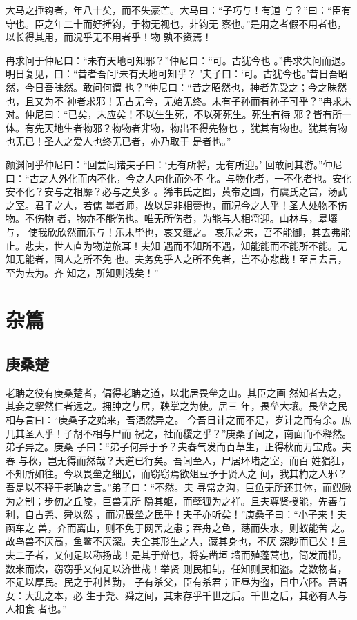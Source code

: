 \documentclass[12pt,UTF8]{ctexbook}
\begin{document}
大马之捶钩者，年八十矣，而不失豪芒。大马曰：“子巧与！有道 与？”曰：“臣有守也。臣之年二十而好捶钩，于物无视也，非钩无 察也。”是用之者假不用者也，以长得其用，而况乎无不用者乎！物 孰不资焉！

冉求问于仲尼曰：“未有天地可知邪？”仲尼曰：“可。古犹今也 。”冉求失问而退。明日复见，曰：“昔者吾问‘未有天地可知乎？ ’夫子曰：‘可。古犹今也。’昔日吾昭然，今日吾昧然。敢问何谓 也？”仲尼曰：“昔之昭然也，神者先受之；今之昧然也，且又为不 神者求邪！无古无今，无始无终。未有子孙而有孙子可乎？”冉求未 对。仲尼曰：“已矣，末应矣！不以生生死，不以死死生。死生有待 邪？皆有所一体。有先天地生者物邪？物物者非物，物出不得先物也 ，犹其有物也。犹其有物也无已！圣人之爱人也终无已者，亦乃取于 是者也。”

颜渊问乎仲尼曰：“回尝闻诸夫子曰：‘无有所将，无有所迎。’ 回敢问其游。”仲尼曰：“古之人外化而内不化，今之人内化而外不 化。与物化者，一不化者也。安化安不化？安与之相靡？必与之莫多 。狶韦氏之囿，黄帝之圃，有虞氏之宫，汤武之室。君子之人，若儒 墨者师，故以是非相赍也，而况今之人乎！圣人处物不伤物。不伤物 者，物亦不能伤也。唯无所伤者，为能与人相将迎。山林与，皋壤与， 使我欣欣然而乐与！乐未毕也，哀又继之。 哀乐之来，吾不能御，其去弗能止。悲夫，世人直为物逆旅耳！夫知 遇而不知所不遇，知能能而不能所不能。无知无能者，固人之所不免 也。夫务免乎人之所不免者，岂不亦悲哉！至言去言，至为去为。齐 知之，所知则浅矣！”


\chapter{杂篇}

\section{庚桑楚}

老聃之役有庚桑楚者，偏得老聃之道，以北居畏垒之山。其臣之画 然知者去之，其妾之挈然仁者远之。拥肿之与居，鞅掌之为使。居三 年，畏垒大壤。畏垒之民相与言曰：“庚桑子之始来，吾洒然异之。 今吾日计之而不足，岁计之而有余。庶几其圣人乎！子胡不相与尸而 祝之，社而稷之乎？”庚桑子闻之，南面而不释然。弟子异之。庚桑 子曰：“弟子何异于予？夫春气发而百草生，正得秋而万宝成。夫春 与秋，岂无得而然哉？天道已行矣。吾闻至人，尸居环堵之室，而百 姓猖狂，不知所如往。今以畏垒之细民，而窃窃焉欲俎豆予于贤人之 间，我其杓之人邪？吾是以不释于老聃之言。”弟子曰：“不然。夫 寻常之沟，巨鱼无所还其体，而鲵鳅为之制；步仞之丘陵，巨兽无所 隐其躯，而孽狐为之祥。且夫尊贤授能，先善与利，自古尧、舜以然 ，而况畏垒之民乎！夫子亦听矣！”庚桑子曰：“小子来！夫函车之 兽，介而离山，则不免于网罟之患；吞舟之鱼，荡而失水，则蚁能苦 之。故鸟兽不厌高，鱼鳖不厌深。夫全其形生之人，藏其身也，不厌 深眇而已矣！且夫二子者，又何足以称扬哉！是其于辩也，将妄凿垣 墙而殖蓬蒿也，简发而栉，数米而炊，窃窃乎又何足以济世哉！举贤 则民相轧，任知则民相盗。之数物者，不足以厚民。民之于利甚勤， 子有杀父，臣有杀君；正昼为盗，日中穴阫。吾语女：大乱之本，必 生于尧、舜之间，其末存乎千世之后。千世之后，其必有人与人相食 者也。”
\end{document}
